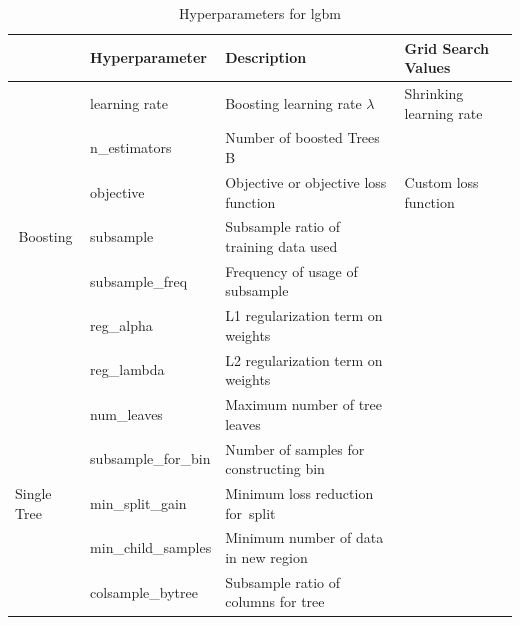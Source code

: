 \documentclass[12pt,titlepage]{article}
\begin{document}
\begin{table} \label{hp_lgbm}
    \centering
    \caption{Hyperparameters for lgbm}
    \begin{tabular}{c|l|l|l|} 
    \hline
    \multicolumn{1}{l|}{}                                       & Hyperparameter      & Description                                                                                      & Grid Search Values       \\ 
    \hline
    \multirow{7}{*}{\begin{sideways} Boosting \end{sideways}}                         & learning rate       & Boosting learning rate $\lambda$                                                                & Shrinking learning rate  \\
    & n\_estimators       & Number of boosted Trees B              &                          \\
    & objective           & Objective or objective loss function   & Custom loss function     \\
    & subsample           & Subsample ratio of training data used  &                          \\
    & subsample\_freq     & Frequency of usage of subsample        &                          \\
    & reg\_alpha          & L1 regularization term on weights      &                          \\
    & reg\_lambda         & L2 regularization term on weights      &                          \\
    \hline
    \multicolumn{1}{l|}{\multirow{5}{*}{\begin{sideways} Single Tree \end{sideways}}} & num\_leaves         & Maximum number of tree leaves          &                          \\
    \multicolumn{1}{l|}{}                                       & subsample\_for\_bin & Number of samples for constructing bin &                          \\
    \multicolumn{1}{l|}{}                                       & min\_split\_gain    & Minimum loss reduction for~split       &                          \\
    \multicolumn{1}{l|}{}                                       & min\_child\_samples & Minimum number of data in new region   &                          \\
    \multicolumn{1}{l|}{}                                       & colsample\_bytree   & Subsample ratio of columns for tree    &                          \\
    \hline
    \end{tabular}
\end{table}
\end{document}
